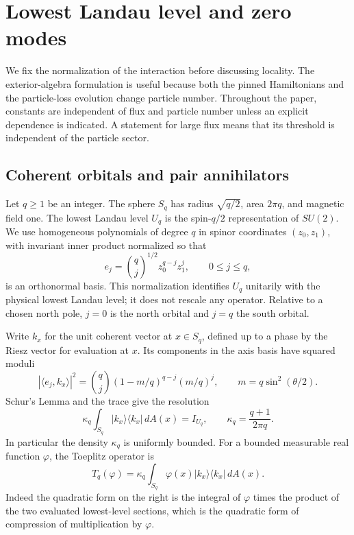 \section{Lowest Landau level and zero modes}\label{sec:prelim}

We fix the normalization of the interaction before discussing locality.
The exterior-algebra formulation is useful because both the pinned
Hamiltonians and the particle-loss evolution change particle number.
Throughout the paper, constants are independent of flux and particle
number unless an explicit dependence is indicated. A statement for large
flux means that its threshold is independent of the particle sector.

\subsection{Coherent orbitals and pair annihilators}

Let $q\ge1$ be an integer. The sphere $S_q$ has radius $\sqrt{q/2}$,
area $2\pi q$, and magnetic field one. The lowest Landau level $U_q$ is
the spin-$q/2$ representation of $SU(2)$. We use homogeneous polynomials
of degree $q$ in spinor coordinates $(z_0,z_1)$, with invariant inner
product normalized so that
\[
 e_j=\binom qj^{1/2}z_0^{q-j}z_1^j,
 \qquad 0\le j\le q,
\]
is an orthonormal basis. This normalization identifies $U_q$ unitarily
with the physical lowest Landau level; it does not rescale any operator.
Relative to a chosen north pole, $j=0$ is the north orbital and $j=q$
the south orbital.

Write $k_x$ for the unit coherent vector at $x\in S_q$, defined up to
a phase by the Riesz vector for evaluation at $x$. Its components in
the axis basis have squared moduli
\begin{equation}\label{eq:binomial-coherent}
 |\langle e_j,k_x\rangle|^2
 =\binom qj (1-m/q)^{q-j}(m/q)^j,
 \qquad m=q\sin^2(\theta/2).
\end{equation}
Schur's Lemma and the trace give the resolution
\begin{equation}\label{eq:coherent-resolution}
 \kappa_q\int_{S_q}|k_x\rangle\langle k_x|\,dA(x)=I_{U_q},
 \qquad \kappa_q=\frac{q+1}{2\pi q}.
\end{equation}
In particular the density $\kappa_q$ is uniformly bounded. For a bounded
measurable real function $\varphi$, the Toeplitz operator is
\begin{equation}\label{eq:toeplitz-resolution}
 T_q(\varphi)=\kappa_q\int_{S_q}
       \varphi(x)|k_x\rangle\langle k_x|\,dA(x).
\end{equation}
Indeed the quadratic form on the right is the integral of $\varphi$
times the product of the two evaluated lowest-level sections, which is
the quadratic form of compression of multiplication by $\varphi$.

